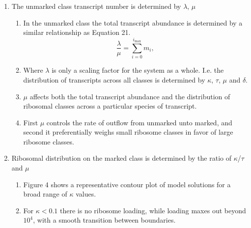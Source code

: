\documentclass[review]{elsarticle}
\newcommand{\imax}{\ensuremath{i_{\max}}\xspace}
\begin{document}
\begin{enumerate}%
	\item The unmarked class transcript number is determined by $\lambda$, $\mu$
	\begin{enumerate}	
		\item In the unmarked class the total transcript abundance is determined by a similar relationship as Equation 21. %
		\begin{equation}\label{eq:eq_unmarked_sum}
			\frac{\lambda}{\mu}=\sum_{i=0}^{\imax}m_{i},
		\end{equation}
		\item Where $\lambda$ is only a scaling factor for the system as a whole. I.e. the distribution of transcripts across all classes is determined by $\kappa$, $\tau$, $\mu$ and $\delta$. %
		\item $\mu$ affects both the total transcript abundance and the distribution of ribosomal classes across a particular species of transcript.
		\item First $\mu$ controls the rate of outflow from unmarked unto marked, and second it preferentially weighs small ribosome classes in favor of large ribosome classes.
	\end{enumerate}
	
	\item  Ribosomal distribution on the marked class is determined by the ratio of $\kappa$/$\tau$ and $\mu$
	\begin{enumerate}
		\item Figure 4 shows a representative contour plot of model solutions for a broad range of $\kappa$ values.
		\item For  $\kappa < 0.1 $  there is no ribosome loading, while loading maxes out beyond $10^4$, with a smooth transition between boundaries. 


\end{enumerate}
\end{enumerate}
\end{document}
